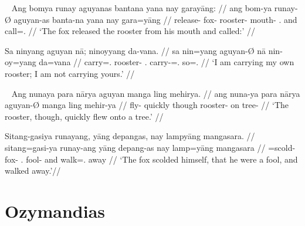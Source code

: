 \xe

\pex~ %
\a\begingl
	\gla Ang bomya runay aguyanas bantana yana nay garayāng: //
	\glb ang bom-ya runay-Ø aguyan-as banta-na yana nay gara=yāng //
	\glc \AgtT{} release-\TsgM{} fox-\Top{} rooster-\Parg{} mouth-\Gen{}
		\TsgM{}.\Gen{} and call=\TsgM{}.\Aarg{} //
	\glft `The fox released the rooster from his mouth and called:' //
\endgl

\a\begingl
	\gla Sa ninyang aguyan nā; ninoyyang da-vana. //
	\glb sa nin=yang aguyan-Ø nā nin-oy=yang da=vana //
	\glc \PatT{} carry=\Fsg{}.\Aarg{} rooster-\Top{} \Fsg{}.\Gen{}
		carry-\Neg{}=\Fsg{}.\Aarg{} so=\Spl{}.\Gen{} //
	\glft `I am carrying my own rooster; I am not carrying yours.' //
\endgl

\xe

\pex~ %
\a\begingl
	\gla Ang nunaya para nārya aguyan manga ling mehirya. //
	\glb ang nuna-ya para nārya aguyan-Ø manga ling mehir-ya //
	\glc \AgtT{} fly-\TsgM{} quickly though rooster-\Top{} \Dir{} on
		tree-\Loc{} //
	\glft `The rooster, though, quickly flew onto a tree.' //
\endgl

\a\label{ex:objpred}\begingl
	\gla Sitang-gasiya runayang, yāng depangas, nay lampyāng mangasara. //
	\glb sitang=gasi-ya runay-ang yāng depang-as nay lamp=yāng mangasara //
	\glc \Refl{}=scold-\TsgM{} fox-\Aarg{} \TsgM{}.\Aarg{} fool-\Parg{} and
		walk=\TsgM{}.\Aarg{} away //
	\glft `The fox scolded himself, that he were a fool, and walked 
		away.'\footnotemark //
\endgl

\xe


\section{Ozymandias}
\label{sec:ozymandias}


\citep[Adapted from][]{becker:ozymandias}\medskip

